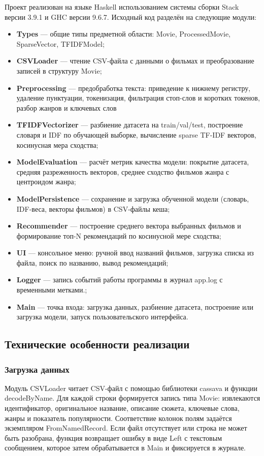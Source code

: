 \documentclass[a4paper, 16pt]{article}
\begin{document}
Проект реализован на языке Haskell использованием системы сборки Stack версии 3.9.1 и GHC версии 9.6.7. 
Исходный код разделён на следующие модули:

\begin{itemize}
    \item \textbf{Types} --- общие типы предметной области: Movie, ProcessedMovie, SparseVector, TFIDFModel;
    \item \textbf{CSVLoader} --- чтение CSV-файла с данными о фильмах и преобразование записей в структуру Movie;
    \item \textbf{Preprocessing} --- предобработка текста: приведение к нижнему регистру, удаление пунктуации, токенизация, фильтрация стоп-слов и коротких токенов, разбор жанров и ключевых слов
    \item \textbf{TFIDFVectorizer} --- разбиение датасета на train/val/test, построение словаря и IDF по обучающей выборке, вычисление sparse TF-IDF векторов, косинусная мера сходства;
    \item \textbf{ModelEvaluation} --- расчёт метрик качества модели: покрытие датасета, средняя разреженность векторов, среднее сходство фильмов жанра с центроидом жанра;
    \item \textbf{ModelPersistence} --- сохранение и загрузка обученной модели (словарь, IDF-веса, векторы фильмов) в CSV-файлы кеша;
    \item \textbf{Recommender} --- построение среднего вектора выбранных фильмов и формирование топ-N рекомендаций по косинусной мере сходства;
    \item \textbf{UI} --- консольное меню: ручной ввод названий фильмов, загрузка списка из файла, поиск по названию, вывод рекомендаций;
    \item \textbf{Logger} --- запись событий работы программы в журнал app.log с временными метками.;
    \item \textbf{Main} --- точка входа: загрузка данных, разбиение датасета, построение или загрузка модели, запуск пользовательского интерфейса.
\end{itemize}


\subsection{Технические особенности реализации}

\subsubsection{Загрузка данных}
Модуль CSVLoader читает CSV-файл с помощью библиотеки cassava и функции decodeByName. 
Для каждой строки формируется запись типа Movie: извлекаются идентификатор, оригинальное название, 
описание сюжета, ключевые слова, жанры и показатель популярности. Соответствие колонок полям задаётся 
экземпляром FromNamedRecord. Если файл отсутствует или строка не может быть разобрана, функция 
возвращает ошибку в виде Left с текстовым сообщением, которое затем обрабатывается в Main и фиксируется в журнале.
\end{document}
